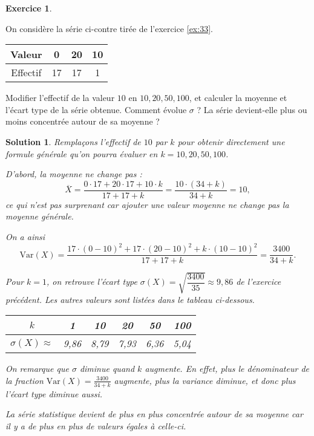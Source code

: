 \documentclass[a4paper, 14pt]{extarticle}
\theoremstyle{plain}
\newtheorem*{sol}{Solution}
\theoremstyle{definition}
\newtheorem{ex}{Exercice}
\newcommand{\Var}[1]{\text{Var}(#1)}
\newcommand{\exe}[2]{
		\begin{ex} #1  \end{ex}
		\begin{sol} #2 \end{sol}
	}
\newcommand{\exe}[2]{
		\begin{ex} #1  \end{ex}
	}
\begin{document}
\exe{
	\begin{multicols}{2}
	On considère la série ci-contre tirée de l'exercice \ref{ex:33}.
	
		\begin{center}
		\begin{tabular}{|c|c|c|c|}\hline
		Valeur   & 0 & 20 & 10 \\ \hline
		Effectif & 17 & 17 & 1 \\ \hline
		\end{tabular}
		\end{center}
	\end{multicols}
		
	Modifier l'effectif de la valeur $10$ en $10, 20, 50, 100$, et calculer la moyenne et l'écart type de la série obtenue.
	Comment évolue $\sigma$ ? La série devient-elle plus ou moins concentrée autour de sa moyenne ?
}{
	Remplaçons l'effectif de $10$ par $k$ pour obtenir directement une formule générale qu'on pourra évaluer en $k=10, 20, 50, 100$.

	D'abord, la moyenne ne change pas :
		\[ \overline{X} = \dfrac{0\cdot17 + 20\cdot17 + 10\cdot k}{17+17+k} = \dfrac{10\cdot(34 + k)}{34+k} = 10, \]
	ce qui n'est pas surprenant car ajouter une valeur moyenne ne change pas la moyenne générale.

	On a ainsi 
		\[ \Var{X} = \dfrac{17\cdot(0-10)^2+17\cdot(20-10)^2 + k\cdot(10-10)^2}{17+17+k} = \dfrac{3400}{34+k}. \]
		
	Pour $k=1$, on retrouve l'écart type $\sigma(X) = \sqrt{\dfrac{3400}{35}} \approx 9,86$ de l'exercice précédent.
	Les autres valeurs sont listées dans le tableau ci-dessous.
	
	\begin{center}
	\begin{tabular}{|c|c|c|c|c|c|}\hline
		$k$ & 1 & 10 & 20 & 50 & 100 \\ \hline
		$\sigma(X) \approx$ & 9,86 & 8,79 & 7,93 & 6,36 & 5,04 \\ \hline
	\end{tabular}
	\end{center}
	
	On remarque que $\sigma$ diminue quand $k$ augmente.
	En effet, plus le dénominateur de la fraction $\Var{X} = \frac{3400}{34+k}$ augmente, plus la variance diminue, et donc plus l'écart type diminue aussi.
	
	La série statistique devient de plus en plus concentrée autour de sa moyenne car il y a de plus en plus de valeurs égales à celle-ci.
}
\end{document}
